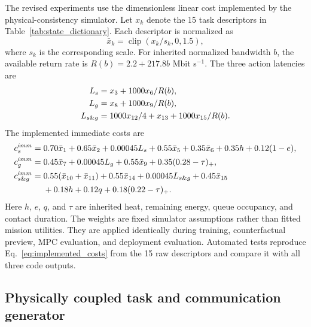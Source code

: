 \documentclass[11pt]{article}
\DeclareMathOperator{\clip}{clip}
\begin{document}
The revised experiments use the dimensionless linear cost implemented by the physical-consistency simulator. Let $x_k$ denote the 15 task descriptors in Table~\ref{tab:state_dictionary}. Each descriptor is normalized as
\begin{equation}
\bar x_k=\clip(x_k/s_k,0,1.5),
\end{equation}
where $s_k$ is the corresponding scale. For inherited normalized bandwidth $b$, the available return rate is $R(b)=2.2+217.8b$ Mbit s$^{-1}$. The three action latencies are
\begin{align}
L_s&=x_3+1000x_6/R(b),\notag\\
L_g&=x_8+1000x_9/R(b),\notag\\
L_{s\&g}&=1000x_{12}/4+x_{13}+1000x_{15}/R(b).
\label{eq:latencies}
\end{align}
The implemented immediate costs are
\begin{align}
c_s^{imm}={}&0.70\bar x_1+0.65\bar x_2+0.00045L_s+0.55\bar x_5
+0.35\bar x_6+0.35h+0.12(1-e),\notag\\
c_g^{imm}={}&0.45\bar x_7+0.00045L_g+0.55\bar x_9
+0.35(0.28-\tau)_+,\notag\\
c_{s\&g}^{imm}={}&0.55(\bar x_{10}+\bar x_{11})+0.55\bar x_{14}
+0.00045L_{s\&g}+0.45\bar x_{15}\notag\\
&+0.18h+0.12q+0.18(0.22-\tau)_+.
\label{eq:implemented_costs}
\end{align}
Here $h$, $e$, $q$, and $\tau$ are inherited heat, remaining energy, queue occupancy, and contact duration. The weights are fixed simulator assumptions rather than fitted mission utilities. They are applied identically during training, counterfactual preview, MPC evaluation, and deployment evaluation. Automated tests reproduce Eq.~\eqref{eq:implemented_costs} from the 15 raw descriptors and compare it with all three code outputs.

\begin{table}[H]
\centering
\caption{Implemented 15-dimensional task descriptor dictionary. The six appended resource coordinates are $h$, $e$, $q$, compute utilization $u$, bandwidth $b$, and contact duration $\tau$.}
\label{tab:state_dictionary}
\resizebox{\textwidth}{!}{}
\end{table}

\subsection{Physically coupled task and communication generator}
\end{document}
